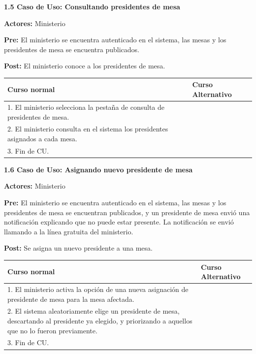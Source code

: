 \textbf{1.5 Caso de Uso: Consultando presidentes de mesa}

\textbf{Actores:} Ministerio 

\textbf{Pre:} El ministerio se encuentra autenticado en el sistema, las mesas y los presidentes de mesa se encuentra publicados.

\textbf{Post:} El ministerio conoce a los presidentes de mesa.
\begin{table}[h!]
	
 \begin{tabular}{|p{7.5cm} | p{7.5cm}|} 
 \hline
 \textbf{Curso normal} & \textbf{Curso Alternativo} \\
 \hline

1. El ministerio selecciona la pestaña de consulta de presidentes de mesa. & \\
\hline
2. El ministerio consulta en el sistema los presidentes asignados a cada mesa. & \\
\hline
3. Fin de CU. & \\
\hline
 \end{tabular}

\end{table}

\textbf{1.6 Caso de Uso: Asignando nuevo presidente de mesa}

\textbf{Actores:} Ministerio 

\textbf{Pre:} El ministerio se encuentra autenticado en el sistema, las mesas y los presidentes de mesa se encuentran publicados, y un presidente de mesa envió una notificación explicando que no puede estar presente. La notificación se envió llamando a la línea gratuita del ministerio.

\textbf{Post:} Se asigna un nuevo presidente a una mesa.
\begin{table}[h!]
	
 \begin{tabular}{|p{7.5cm} | p{7.5cm}|} 
 \hline
 \textbf{Curso normal} & \textbf{Curso Alternativo} \\
 \hline

1. El ministerio activa la opción de una nueva asignación de presidente de mesa para la mesa afectada. & \\
\hline

2.  El sistema aleatoriamente elige un presidente de mesa, descartando al presidente ya elegido, y priorizando a aquellos que no lo fueron previamente. & \\
\hline


3. Fin de CU. & \\
\hline



 \end{tabular}

\end{table}

